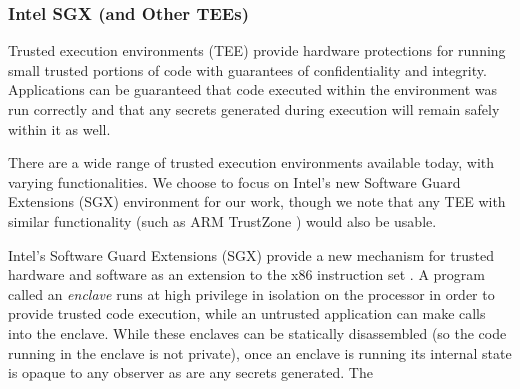 \subsubsection{Intel SGX (and Other TEEs)}
Trusted execution environments (TEE) provide hardware protections for running
small trusted portions of code with guarantees of confidentiality and
integrity.  Applications can be guaranteed that code executed within the
environment was run correctly and that any secrets generated during execution
will remain safely within it as well.

There are a wide range of trusted execution environments available today, with
varying functionalities.  We choose to focus on Intel's new Software Guard
Extensions (SGX) environment for our work, though we note that any TEE with
similar functionality (such as ARM TrustZone \cite{trustzone}) would also be
usable.


Intel's Software Guard Extensions (SGX) provide a new mechanism for trusted
hardware and software as an extension to the x86 instruction set \cite{sgx,
mckeen2013innovative}.  A program called an \textit{enclave} runs at high
privilege in isolation on the processor in order to provide trusted code
execution, while an untrusted application can make calls into the enclave.
While these enclaves can be statically disassembled (so the code running in the
enclave is not private), once an enclave is running its internal state is
opaque to any observer as are any secrets generated.  The 

